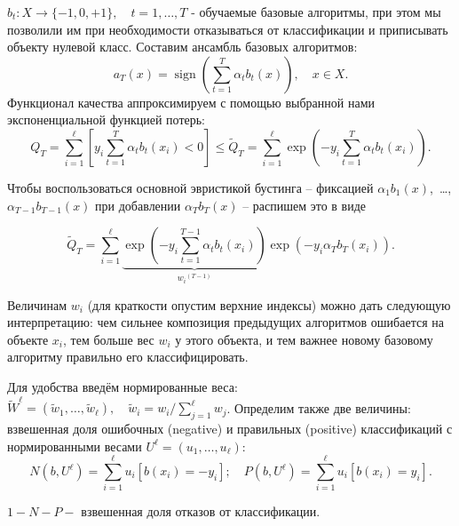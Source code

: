     \noindent$b_t: X \rightarrow \{-1, 0, +1\},\quad t=1, \ldots, T$ - обучаемые базовые алгоритмы, при этом мы позволили им при необходимости отказываться от классификации и приписывать объекту нулевой класс.
    Составим ансамбль базовых алгоритмов:
	\begin{equation*}
    	a_T(x)=\operatorname{sign}\left(\sum_{t=1}^T \alpha_t b_t(x)\right), \quad x \in X.
    \end{equation*}
    Функционал качества аппроксимируем с помощью выбранной нами экспоненциальной функцией потерь:
    \begin{equation*}
    	Q_T=\sum_{i=1}^{\ell}\left[y_i \sum_{t=1}^T \alpha_t b_t\left(x_i\right)<0\right]\leqslant \widetilde{Q}_T=\sum_{i=1}^{\ell} {\exp \left(-y_i \sum_{t=1}^{T} \alpha_t b_t\left(x_i\right)\right)}.
    \end{equation*}
    
    
    Чтобы воспользоваться основной эвристикой бустинга
    -- фиксацией $\alpha_1 b_1(x)$,~\ldots, $\alpha_{T-1} b_{T-1}(x)$ при добавлении $\alpha_T b_T(x)$ -- распишем это в виде
    
    \begin{equation*}
    \widetilde{Q}_T=\sum_{i=1}^{\ell} \underbrace{\exp \left(-y_i \sum_{t=1}^{T-1} \alpha_t b_t\left(x_i\right)\right)}_{{w_i}^{(T-1)}} \exp \left(-y_i \alpha_T b_T\left(x_i\right)\right).
    \end{equation*}
    
    Величинам $w_i$ (для краткости опустим верхние индексы) можно дать следующую интерпретацию: чем сильнее композиция предыдущих алгоритмов ошибается на объекте $x_i$, тем больше вес $w_i$ у этого объекта, и тем важнее новому базовому алгоритму правильно его классифицировать.
    
    Для удобства введём нормированные веса: $\widetilde{W}^{\ell}=\left(\tilde{w}_1, \ldots, \tilde{w}_{\ell}\right), \quad \tilde{w}_i=w_i / \sum_{j=1}^{\ell} w_j$.
    Определим также две величины: взвешенная доля ошибочных (negative) и правильных (positive) классификаций с нормированными весами $U^{\ell}=\left(u_1, \ldots, u_{\ell}\right)$:
    \begin{equation*}
    	N\left(b, U^{\ell}\right)=\sum_{i=1}^{\ell} u_i\left[b\left(x_i\right)=-y_i\right] ; \quad P\left(b, U^{\ell}\right)=\sum_{i=1}^{\ell} u_i\left[b\left(x_i\right)=y_i\right] .
    \end{equation*}
    
    $1-N-P-$ взвешенная доля отказов от классификации.
    
